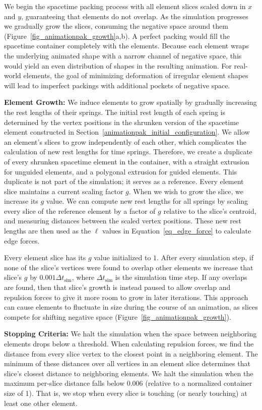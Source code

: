 We begin the spacetime packing process with all element slices scaled
down in $x$ and $y$, guaranteeing that elements do not 
overlap.  As the simulation progresses we gradually grow the slices, 
consuming the negative space around them (Figure~\ref{fig_animationpak_growth}a,b).
A perfect packing would fill the spacetime container completely with the elements.
Because each element wraps the underlying animated shape with a narrow channel
of negative space, this would yield an even
distribution of shapes in the resulting animation.
For real-world elements, the goal of minimizing deformation of irregular 
element shapes will lead to imperfect packings with additional pockets
of negative space.


\textbf{Element Growth:}
We induce elements to grow spatially by gradually increasing the rest 
lengths of their springs.
The initial rest length of each spring is determined by the vertex positions in
the shrunken version of the spacetime element constructed in 
Section~\ref{animationpak_initial_configuration}.
We allow an element's slices to grow independently of each other, which
complicates the calculation of new rest lengths for time springs.
Therefore, we create a duplicate of every shrunken spacetime element
in the container, with a straight extrusion
for unguided elements, and a polygonal extrusion for guided elements.
This duplicate is not part of the simulation; it serves as a reference.
Every element slice maintains a current scaling factor $g$.
When we wish to grow the slice, we increase its $g$ value.
We can compute new rest lengths for all springs by scaling every slice
of the reference element by a factor of $g$ relative to the
slice's centroid, and measuring distances between the scaled vertex
positions.  These new rest lengths are then used as the $\ell$ values
in Equation~\ref{eq_edge_force} to calculate edge forces.

Every element slice has its $g$ value initialized to $1$.  After every
simulation step, if none of the slice's vertices were found to 
overlap other elements we increase that slice's $g$ by 
$0.001 \Delta t_\mathrm{sim}$, where $\Delta t_\mathrm{sim}$ is the 
simulation time step.  If any overlaps are found, then that slice's
growth is instead paused to allow overlap and repulsion forces to give it more
room to grow in later iterations.  
This approach can cause elements to fluctuate in size during the course
of an animation, as slices compete for shifting negative space 
(Figure~\ref{fig_animationpak_growth}).

\textbf{Stopping Criteria:} We halt the simulation when the space between
neighboring elements drops below a threshold.  When calculating 
repulsion forces, we find the distance from every slice vertex
to the closest point in a neighboring element.  The minimum of these
distances over all vertices in an element slice determines that slice's
closest distance to neighboring elements.  We halt the simulation
when the maximum per-slice distance falls below 0.006 (relative to a normalized
container size of 1).  That is, we stop when every slice is touching
(or nearly touching) at least one other element.


